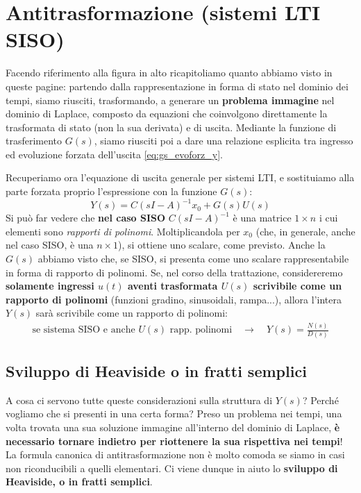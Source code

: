 \section{Antitrasformazione (sistemi LTI SISO)}
\bb
Facendo riferimento alla figura in alto ricapitoliamo quanto abbiamo visto in queste pagine: partendo dalla rappresentazione in forma di stato nel dominio dei tempi, siamo riusciti, trasformando, a generare un \textbf{problema immagine} nel dominio di Laplace, composto da equazioni che coinvolgono direttamente la trasformata di stato (non la sua derivata) e di uscita. Mediante la funzione di trasferimento $G(s)$, siamo riusciti poi a dare una relazione esplicita tra ingresso ed evoluzione forzata dell'uscita \eqref{eq:gs_evoforz_y}. 
\begin{defin}{}{}
Recuperiamo ora l'equazione di uscita generale per sistemi LTI, e sostituiamo alla parte forzata proprio l'espressione con la funzione $G(s)$:
\begin{equation*}
Y(s) = C(sI-A)^{-1} x_0 + G(s)U(s)
\end{equation*}
Si può far vedere che \textbf{nel caso SISO} $C(sI-A)^{-1}$ è una matrice $1 \times n$ i cui elementi sono \textit{rapporti di polinomi}. Moltiplicandola per $x_0$ (che, in generale, anche nel caso SISO, è una $n\times 1$), si ottiene uno scalare, come previsto. Anche la $G(s)$ abbiamo visto che, se SISO, si presenta come uno scalare rappresentabile in forma di rapporto di polinomi.  Se, nel corso della trattazione,  considereremo \textbf{solamente ingressi $u(t)$ aventi trasformata $U(s)$ scrivibile come un rapporto di polinomi}  (funzioni gradino, sinusoidali, rampa...), allora l'intera $Y(s)$ sarà scrivibile come un rapporto di polinomi: 
\begin{align}
\label{eq:y_rapp_poli}
\textrm{se sistema SISO e anche $U(s)$ rapp. polinomi} \quad \rightarrow \quad \boxed{Y(s) = \frac{N(s)}{D(s)}}
\end{align}
\end{defin}
\subsection{Sviluppo di Heaviside o in fratti semplici}
A cosa ci servono tutte queste considerazioni sulla struttura di $Y(s)$? Perché vogliamo che si presenti in una certa forma? Preso un problema nei tempi, una volta trovata una sua soluzione immagine all'interno del dominio di Laplace, \textbf{è necessario tornare indietro per riottenere la sua rispettiva nei tempi}! La formula canonica di antitrasformazione non è molto comoda se siamo in casi non riconducibili a quelli elementari. Ci viene dunque in aiuto lo \textbf{sviluppo di Heaviside, o in fratti semplici}.

